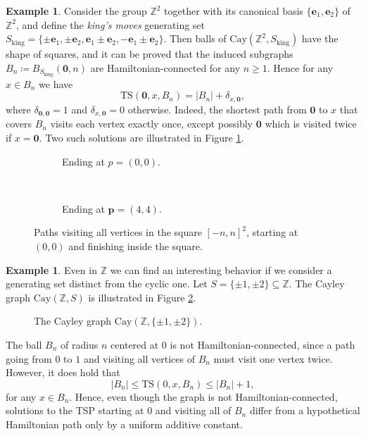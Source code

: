 \documentclass[reqno,oneside]{amsart}
\newcommand{\cay}[2]{\mathrm{Cay}(#1,#2)}
\newcommand{\Z}{\mathbb{Z}}
\newcommand{\TS}[3]{\mathrm{TS}\left(#1,#2,#3\right)}
\theoremstyle{plain}
\theoremstyle{definition}
\newtheorem{exmp}[thm]{Example} %
\begin{document}
\begin{exmp}\label{example: qH Z^2}
	Consider the group $\Z^2$ together with its canonical basis $\{\mathbf{e}_1,\mathbf{e}_2\}$ of $\Z^2$, and define the \textit{king's moves} generating set $S_{\mathrm{king}}=\{\pm\mathbf{e}_1,\pm\mathbf{e}_2,\mathbf{e}_1\pm\mathbf{e}_2,-\mathbf{e}_1\pm \mathbf{e}_2\}$. Then balls of $\cay{\Z^2}{S_{\mathrm{king}}}$ have the shape of squares, and it can be proved that the induced subgraphs $B_n\coloneqq B_{S_{\mathrm{king}}}(\mathbf{0},n)$ are Hamiltonian-connected for any $n\ge 1$. Hence for any $x\in B_n$ we have
	$$
	\TS{\mathbf{0}}{x}{B_n}=|B_n|+\delta_{x,\mathbf{0}},
	$$
	where $\delta_{\mathbf{0},\mathbf{0}}=1$ and $\delta_{x,\mathbf{0}}=0$ otherwise. Indeed, the shortest path from $\mathbf{0}$ to $x$ that covers $B_n$ visits each vertex exactly once, except possibly $\mathbf{0}$ which is visited twice if $x=\mathbf{0}$. Two such solutions are illustrated in Figure \ref{fig: Z^2 hamiltonian paths}.
	\begin{figure}[h!]
		\centering
		\begin{subfigure}[t]{0.5\textwidth}
			\centering
			\resizebox{0.95\textwidth}{!}{
				}
			\caption{Ending at $p=(0,0)$.}
		\end{subfigure}%
		~ 
		\begin{subfigure}[t]{0.5\textwidth}
			\centering
			\resizebox{0.95\textwidth}{!}{
				}
			\caption{Ending at $\mathbf{p}=(4,4)$.}
		\end{subfigure}
		\caption{Paths visiting all vertices in the square $[-n,n]^2$, starting at $(0,0)$ and finishing inside the square.}
		\label{fig: Z^2 hamiltonian paths}
	\end{figure}
\end{exmp}

\begin{exmp}\label{example: qH Z with {1,2}}
	Even in $\Z$ we can find an interesting behavior if we consider a generating set distinct from the cyclic one. Let $S=\{\pm1 ,\pm2 \}\subseteq \Z$. The Cayley graph $\cay{\Z}{S}$ is illustrated in Figure \ref{fig: Cayleygraph of (Z,{1,2}) is not Hamiltonian-connected}. 	
	\begin{figure}[h!]
		\centering
		
		\caption{The Cayley graph $\cay{\Z}{\{\pm 1,\pm 2\}}$.}
		\label{fig: Cayleygraph of (Z,{1,2}) is not Hamiltonian-connected}
	\end{figure}
	The ball $B_n$ of radius $n$ centered at $0$ is not Hamiltonian-connected, since a path going from $0$ to $1$ and visiting all vertices of $B_n$ must visit one vertex twice. However, it does hold that
	$$
	|B_n|\le \TS{0}{x}{B_n}\le |B_n|+1,
	$$
	for any $x\in B_n$. Hence, even though the graph is not Hamiltonian-connected, solutions to the TSP starting at $0$ and visiting all of $B_n$ differ from a hypothetical Hamiltonian path only by a uniform additive constant.
	
	
\end{exmp}
\end{document}
